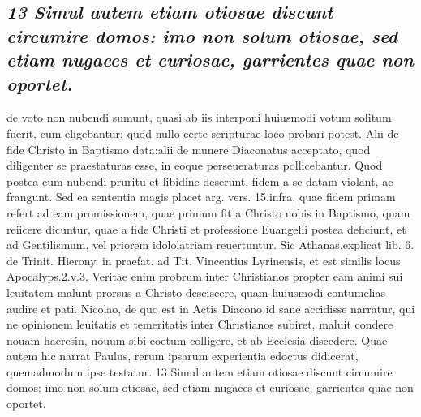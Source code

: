 \documentclass{article}
\begin{document}
\begin{pages}
\subsection*{\textit{13 Simul autem etiam otiosae discunt circumire domos: imo non solum otiosae, sed etiam nugaces et curiosae, garrientes quae non oportet.}}de voto non nubendi sumunt, quasi ab iis interponi huiusmodi votum solitum fuerit, cum eligebantur: quod nullo certe scripturae loco probari potest. Alii de fide Christo in Baptismo data:alii de munere Diaconatus acceptato, quod diligenter se praestaturas esse, in eoque perseueraturas pollicebantur. Quod postea cum nubendi pruritu et libidine deserunt, fidem a se datam violant, ac frangunt. Sed ea sententia magis placet arg. vers. 15.infra, quae fidem primam refert ad eam promissionem, quae primum fit a Christo nobis in Baptismo, quam reiicere dicuntur, quae a fide Christi et professione Euangelii postea deficiunt, et ad Gentilismum, vel priorem idololatriam reuertuntur. Sic Athanas.explicat lib. 6. de Trinit. Hierony. in praefat. ad Tit. Vincentius Lyrinensis, et est similis locus Apocalyps.2.v.3. Veritae enim probrum inter Christianos propter eam animi sui leuitatem malunt prorsus a Christo desciscere, quam huiusmodi contumelias audire et pati. Nicolao, de quo est in Actis Diacono id sane accidisse narratur, qui ne opinionem leuitatis et temeritatis inter Christianos subiret, maluit condere nouam haeresin, nouum sibi coetum colligere, et ab Ecclesia discedere. Quae autem hic narrat Paulus, rerum ipsarum experientia edoctus didicerat, quemadmodum ipse testatur. 13 Simul autem etiam otiosae discunt circumire domos: imo non solum otiosae, sed etiam nugaces et curiosae, garrientes quae non oportet.  \pend

\end{pages}
\end{document}
